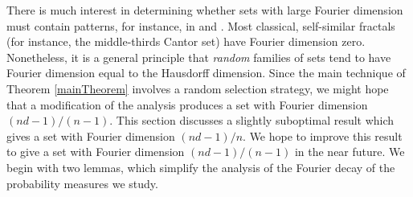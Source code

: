 There is much interest in determining whether sets with large Fourier dimension must contain patterns, for instance, in \cite{PramanikLaba} and \cite{Shmerkin}. Most classical, self-similar fractals (for instance, the middle-thirds Cantor set) have Fourier dimension zero. Nonetheless, it is a general principle that \emph{random} families of sets tend to have Fourier dimension equal to the Hausdorff dimension. Since the main technique of Theorem \ref{mainTheorem} involves a random selection strategy, we might hope that a modification of the analysis produces a set with Fourier dimension $(nd - 1)/(n-1)$. This section discusses a slightly suboptimal result which gives a set with Fourier dimension $(nd - 1)/n$. We hope to improve this result to give a set with Fourier dimension $(nd - 1)/(n-1)$ in the near future. We begin with two lemmas, which simplify the analysis of the Fourier decay of the probability measures we study.

